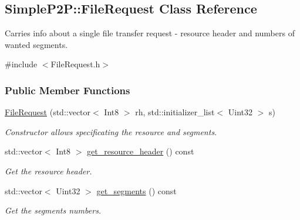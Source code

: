 \hypertarget{classSimpleP2P_1_1FileRequest}{}\subsection{Simple\+P2P\+:\+:File\+Request Class Reference}
\label{classSimpleP2P_1_1FileRequest}


Carries info about a single file transfer request -\/ resource header and numbers of wanted segments.  




{\ttfamily \#include $<$File\+Request.\+h$>$}

\subsubsection*{Public Member Functions}
\begin{DoxyCompactItemize}
\item 
\hyperlink{classSimpleP2P_1_1FileRequest_a6e50d4f7d07a46ddcd72745ebc6e9e81}{File\+Request} (std\+::vector$<$ Int8 $>$ rh, std\+::initializer\+\_\+list$<$ Uint32 $>$ s)
\begin{DoxyCompactList}\small\item\em Constructor allows specificating the resource and segments. \end{DoxyCompactList}\item 
\mbox{\label{classSimpleP2P_1_1FileRequest_a611bde99dbd62e155853e127fa102910}} 
std\+::vector$<$ Int8 $>$ \hyperlink{classSimpleP2P_1_1FileRequest_a611bde99dbd62e155853e127fa102910}{get\+\_\+resource\+\_\+header} () const
\begin{DoxyCompactList}\small\item\em Get the resource header. \end{DoxyCompactList}\item 
\mbox{\label{classSimpleP2P_1_1FileRequest_ad3b33994ea628979673195fd4e3348af}} 
std\+::vector$<$ Uint32 $>$ \hyperlink{classSimpleP2P_1_1FileRequest_ad3b33994ea628979673195fd4e3348af}{get\+\_\+segments} () const
\begin{DoxyCompactList}\small\item\em Get the segments\textquotesingle{} numbers. \end{DoxyCompactList}\end{DoxyCompactItemize}



